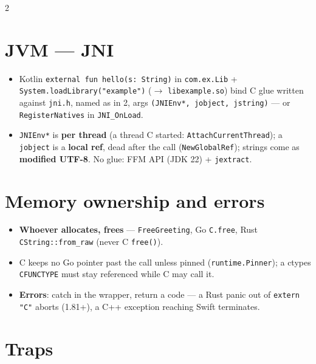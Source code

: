 \documentclass[8pt]{extarticle}
\begin{document}
\begin{multicols}{2}
\section{JVM — JNI}
\begin{itemize}\raggedright
  \item Kotlin \texttt{external fun hello(s: String)} in \texttt{com.ex.Lib} +
        \texttt{System.loadLibrary("example")} ($\to$ \texttt{libexample.so}) bind C glue written
        against \texttt{jni.h}, named as in \textcolor{sheetBlue}{2}, args
        \texttt{(JNIEnv*, jobject, jstring)} — or \texttt{RegisterNatives} in \texttt{JNI\_OnLoad}.
  \item \texttt{JNIEnv*} is \textbf{per thread} (a thread C started: \texttt{AttachCurrentThread});
        a \texttt{jobject} is a \textbf{local ref}, dead after the call (\texttt{NewGlobalRef});
        strings come as \textbf{modified UTF-8}. No glue: FFM API (JDK 22) + \texttt{jextract}.
\end{itemize}

\section{Memory ownership and errors}
\begin{itemize}\raggedright
  \item \textbf{Whoever allocates, frees} — \texttt{FreeGreeting}, Go \texttt{C.free}, Rust
        \texttt{CString\hbox{:}\hbox{:}from\_raw} (never C \texttt{free()}).
  \item C keeps no Go pointer past the call unless pinned (\texttt{runtime.Pinner}); a ctypes
        \texttt{CFUNCTYPE} must stay referenced while C may call it.
  \item \textbf{Errors}: catch in the wrapper, return a code — a Rust panic out of
        \texttt{extern "C"} aborts (1.81+), a C++ exception reaching Swift terminates.
\end{itemize}

\section{Traps}
\begin{itemize}\raggedright
\end{itemize}


\end{multicols}
\end{document}
